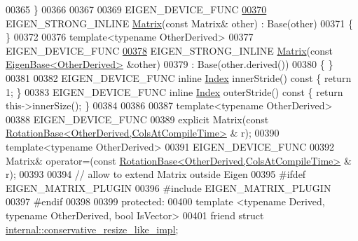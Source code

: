 \begin{DoxyCode}
00365     \}
00366 
00367 
00369     EIGEN\_DEVICE\_FUNC
\hyperlink{group___core___module_aea16cba266274974c729c98e8567f41d}{00370}     EIGEN\_STRONG\_INLINE \hyperlink{group___core___module_aea16cba266274974c729c98e8567f41d}{Matrix}(\textcolor{keyword}{const} Matrix& other) : Base(other)
00371     \{ \}
00372 
00376     \textcolor{keyword}{template}<\textcolor{keyword}{typename} OtherDerived>
00377     EIGEN\_DEVICE\_FUNC
\hyperlink{group___core___module_ae4bcda7578de9624709cbfa8d3ddd9d9}{00378}     EIGEN\_STRONG\_INLINE \hyperlink{group___core___module_ae4bcda7578de9624709cbfa8d3ddd9d9}{Matrix}(\textcolor{keyword}{const} \hyperlink{group___core___module_struct_eigen_1_1_eigen_base}{EigenBase<OtherDerived>} &other)
00379       : Base(other.derived())
00380     \{ \}
00381 
00382     EIGEN\_DEVICE\_FUNC \textcolor{keyword}{inline} \hyperlink{namespace_eigen_a62e77e0933482dafde8fe197d9a2cfde}{Index} innerStride()\textcolor{keyword}{ const }\{ \textcolor{keywordflow}{return} 1; \}
00383     EIGEN\_DEVICE\_FUNC \textcolor{keyword}{inline} \hyperlink{namespace_eigen_a62e77e0933482dafde8fe197d9a2cfde}{Index} outerStride()\textcolor{keyword}{ const }\{ \textcolor{keywordflow}{return} this->innerSize(); \}
00384 
00386 
00387     \textcolor{keyword}{template}<\textcolor{keyword}{typename} OtherDerived>
00388     EIGEN\_DEVICE\_FUNC
00389     \textcolor{keyword}{explicit} Matrix(\textcolor{keyword}{const} \hyperlink{class_eigen_1_1_rotation_base}{RotationBase<OtherDerived,ColsAtCompileTime>}
      & r);
00390     \textcolor{keyword}{template}<\textcolor{keyword}{typename} OtherDerived>
00391     EIGEN\_DEVICE\_FUNC
00392     Matrix& operator=(\textcolor{keyword}{const} \hyperlink{class_eigen_1_1_rotation_base}{RotationBase<OtherDerived,ColsAtCompileTime>}
      & r);
00393 
00394     \textcolor{comment}{// allow to extend Matrix outside Eigen}
00395 \textcolor{preprocessor}{    #ifdef EIGEN\_MATRIX\_PLUGIN}
00396 \textcolor{preprocessor}{    #include EIGEN\_MATRIX\_PLUGIN}
00397 \textcolor{preprocessor}{    #endif}
00398 
00399   \textcolor{keyword}{protected}:
00400     \textcolor{keyword}{template} <\textcolor{keyword}{typename} Derived, \textcolor{keyword}{typename} OtherDerived, \textcolor{keywordtype}{bool} IsVector>
00401     \textcolor{keyword}{friend} \textcolor{keyword}{struct }\hyperlink{struct_eigen_1_1internal_1_1conservative__resize__like__impl}{internal::conservative\_resize\_like\_impl};

\end{DoxyCode}
